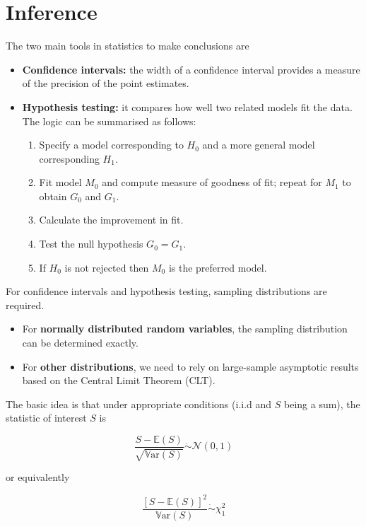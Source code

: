 \documentclass[11pt]{article}
\begin{document}
\section{Inference}

The two main tools in statistics to make conclusions are

\begin{itemize}
    \item \textbf{Confidence intervals:} the width of a confidence interval provides a measure of the precision of the point estimates.
    \item \textbf{Hypothesis testing:} it compares how well two related models fit the data. The logic can be summarised as follows:
    \begin{enumerate}
        \item Specify a model corresponding to \(H_0\) and a more general model corresponding \(H_1\).
        \item Fit model \(M_0\) and compute measure of goodness of fit; repeat for \(M_1\) to obtain \(G_0\) and \(G_1\).
        \item Calculate the improvement in fit.
        \item Test the null hypothesis \(G_0 = G_1\).
        \item If \(H_0\) is not rejected then \(M_0\) is the preferred model.
    \end{enumerate}
\end{itemize}

For confidence intervals and hypothesis testing, sampling distributions are required.

\begin{itemize}
    \item For \textbf{normally distributed random variables}, the sampling distribution can be determined exactly.
    \item For \textbf{other distributions}, we need to rely on large-sample asymptotic results based on the Central Limit Theorem (CLT).
\end{itemize}

The basic idea is that under appropriate conditions (i.i.d and $S$ being a sum), the statistic of interest \(S\) is

\[ \dfrac{S - \mathbb{E}(S)}{\sqrt{\mathbb{V}\text{ar}(S)}} \dot\sim \mathcal{N}(0, 1)\]

or equivalently

\[ \frac{[S - \mathbb{E}(S)]^2}{\mathbb{V}\text{ar}(S)} \dot\sim \chi^2_1\]
\end{document}
